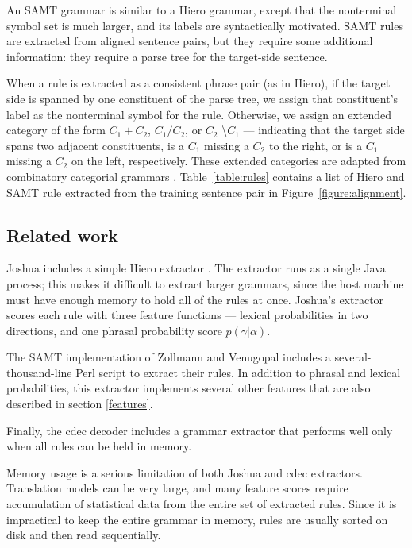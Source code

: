 \documentclass[11pt]{article}
\begin{document}
An SAMT grammar \cite{samt2006} is similar to a Hiero grammar, except
that the nonterminal symbol set is much larger, and its labels are
syntactically motivated.  SAMT rules are extracted from aligned sentence pairs, but they require some additional information: they require a parse tree for the target-side sentence.

When a rule is extracted as a consistent phrase pair (as in Hiero), if
the target side is spanned by one constituent of the parse tree, we
assign that constituent's label as the nonterminal symbol for the
rule.  Otherwise, we assign an extended category of the form
$C_1+C_2$, $C_1 / C_2$, or $C_2$ \textbackslash $C_1$ --- indicating
that the target side spans two adjacent constituents, is a $C_1$
missing a $C_2$ to the right, or is a $C_1$ missing a $C_2$ on the
left, respectively.  These extended categories are adapted from
combinatory categorial grammars \cite{Steedman1999}.
Table~\ref{table:rules} contains a list of Hiero and SAMT rule
extracted from the training sentence pair in Figure~\ref{figure:alignment}.

\subsection{Related work}


Joshua includes a simple Hiero extractor \cite{schwartz2010}. The
extractor runs as a single Java process; this makes it difficult to
extract larger grammars, since the host machine must have enough
memory to hold all of the rules at once.  Joshua's extractor scores each rule with three feature functions --- lexical probabilities in two directions, and one phrasal probability score $p(\gamma|\alpha)$.

The SAMT implementation of Zollmann and Venugopal 
includes a several-thousand-line Perl script to extract their rules.  In addition to phrasal and lexical probabilities, this extractor implements several other features that are also described in section \ref{features}.

Finally, the cdec decoder \cite {cdec} includes a grammar extractor that performs well only when all rules can be held in memory.

Memory usage is a serious limitation of both Joshua and cdec extractors. Translation models can be very large, and many feature scores require accumulation of statistical data from the entire set of extracted rules. Since it is impractical to keep the entire grammar in memory, rules are usually sorted on disk and then read sequentially.
\end{document}
